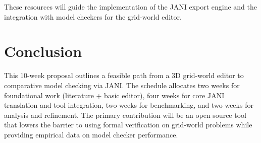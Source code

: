 \documentclass{report}
\begin{document}
These resources will guide the implementation of the JANI export engine and the integration with model checkers for the grid-world editor.

\section*{Conclusion}

This 10-week proposal outlines a feasible path from a 3D grid-world editor to comparative model checking via JANI. The schedule allocates two weeks for foundational work (literature + basic editor), four weeks for core JANI translation and tool integration, two weeks for benchmarking, and two weeks for analysis and refinement. The primary contribution will be an open source tool that lowers the barrier to using formal verification on grid-world problems while providing empirical data on model checker performance.
\end{document}
